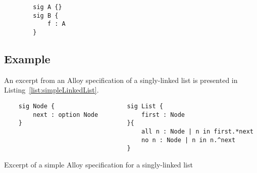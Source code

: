         \begin{singlespacing}
        \begin{verbatim}
        sig A {}
        sig B {
            f : A
        }        \end{verbatim}
        \end{singlespacing}


\subsection{Example}\label{sec:firstAlloyExample}

    An excerpt from an Alloy
    specification of a singly-linked list is presented in
    Listing~\vref{list:simpleLinkedList}.

    \begin{Listing}
    \begin{singlespacing}
    {\small
    \begin{verbatim}
    sig Node {                    sig List {
        next : option Node            first : Node
    }                             }{
                                      all n : Node | n in first.*next
                                      no n : Node | n in n.^next
                                  }    \end{verbatim}
    }
    \caption{Excerpt of a simple Alloy specification for a singly-linked list}
    \label{list:simpleLinkedList}
    \end{singlespacing}
    \end{Listing}
